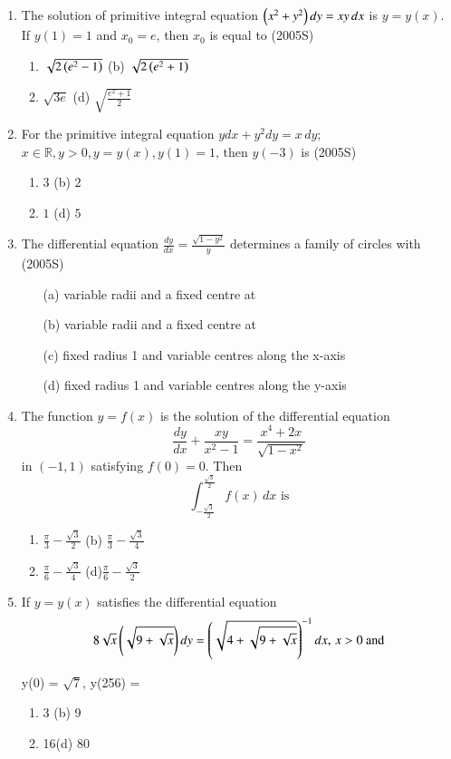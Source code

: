 \documentclass[journal,12pt,twocolumn]{IEEEtran}
\theoremstyle{remark}
\begin{document}
\begin{enumerate}
\item The solution of primitive integral equation $\left(x^2 + y^2\right)dy = xy \, dx$ is $y = y(x)$. If $y(1) = 1$ and $x_0 = e$, then $x_0$ is equal to \hfill (2005S)
\begin{enumerate}[label=(\alph*)]
    \item $\sqrt{2\left(e^2 - 1\right)}$ \quad (b) $\sqrt{2\left(e^2 + 1\right)}$
    \item $\sqrt{3e}$ \quad \quad \quad (d) $\sqrt{\frac{e^2 + 1}{2}}$
\end{enumerate}

\item For the primitive integral equation $y dx + y^2 dy = x \, dy$; $x \in \mathbb{R}, y > 0, y = y(x), y(1) = 1$, then $y(-3)$ is \hfill (2005S)
\begin{enumerate}[label=(\alph*)]
    \item $3$ \quad \quad \quad \quad (b) $2$
    \item $1$ \quad \quad \quad \quad (d) $5$
\end{enumerate}
\item The differential equation $\frac{dy}{dx} = \frac{\sqrt{1-y^2}}{y}$ determines a family of circles with \hfill (2005S)
\begin{enumerate}[label=(\alph*)]
    \item [(a)] variable radii and a fixed centre at 
    \item [(b)] variable radii and a fixed centre at 
    \item [(c)] fixed radius 1 and variable centres along the x-axis
    \item [(d)] fixed radius 1 and variable centres along the y-axis
\end{enumerate}
\item The function $y = f(x)$ is the solution of the differential equation
\[
\frac{dy}{dx} + \frac{xy}{x^2-1} = \frac{x^4 + 2x}{\sqrt{1-x^2}}
\]
in $(-1, 1)$ satisfying $f(0) = 0$. Then
\[
\int_{-\frac{\sqrt{3}}{2}}^{\frac{\sqrt{3}}{2}} f(x) \, dx \text{ is}
\]
\begin{enumerate}[label=(\alph*)]
    \item $\frac{\pi}{3} - \frac{\sqrt{3}}{2}$ \quad (b) $\frac{\pi}{3} - \frac{\sqrt{3}}{4}$
    \item $\frac{\pi}{6} - \frac{\sqrt{3}}{4}$ \quad (d)$\frac{\pi}{6} - \frac{\sqrt{3}}{2}$
\end{enumerate}

\item If $y = y(x)$ satisfies the differential equation
\[
8\sqrt{x} \left(\sqrt{9+\sqrt{x}}\right) dy = \left(\sqrt{4+\sqrt{9+\sqrt{x}}}\right)^{-1} dx, \, x>0 \text{ and}
\]

y(0) = $\sqrt{7}$,  y(256) = 
\begin{enumerate}[label=(\alph*)]
    \item 3 \quad\quad\quad (b) 9
    \item 16\quad\quad\quad (d) 80
\end{enumerate}
\end{enumerate}
\end{document}

